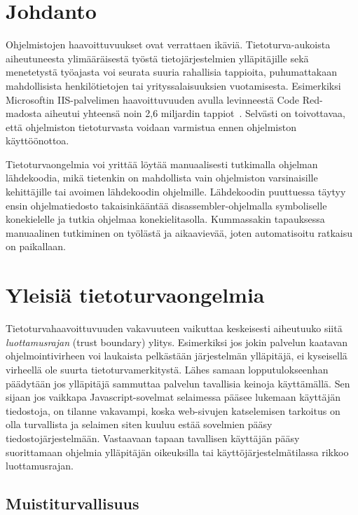 \section{Johdanto}

Ohjelmistojen haavoittuvuukset ovat verrattaen ikäviä.
Tietoturva-aukoista aiheutuneesta ylimääräisestä työstä tietojärjestelmien ylläpitäjille
sekä menetetystä työajasta voi seurata suuria rahallisia tappioita,
puhumattakaan mahdollisista henkilötietojen tai yrityssalaisuuksien vuotamisesta.
Esimerkiksi Microsoftin IIS-palvelimen haavoittuvuuden avulla levinneestä Code Red-madosta
aiheutui yhteensä noin 2,6 miljardin tappiot~\cite{CodeRed}.
Selvästi on toivottavaa, että ohjelmiston tietoturvasta voidaan varmistua ennen ohjelmiston käyttöönottoa.

Tietoturvaongelmia voi yrittää löytää manuaalisesti tutkimalla ohjelman lähdekoodia,
mikä tietenkin on mahdollista vain ohjelmiston varsinaisille kehittäjille
tai avoimen lähdekoodin ohjelmille.
Lähdekoodin puuttuessa täytyy ensin ohjelmatiedosto takaisinkääntää
disassembler-ohjelmalla symboliselle konekielelle
ja tutkia ohjelmaa konekielitasolla.
Kummassakin tapauksessa manuaalinen tutkiminen on työlästä ja aikaavievää, joten automatisoitu ratkaisu on paikallaan.

\section{Yleisiä tietoturvaongelmia}

Tietoturvahaavoittuvuuden vakavuuteen vaikuttaa keskeisesti aiheutuuko siitä \emph{luottamusrajan}
(trust boundary) ylitys.
Esimerkiksi jos jokin palvelun kaatavan ohjelmointivirheen voi laukaista pelkästään järjestelmän
ylläpitäjä, ei kyseisellä virheellä ole suurta tietoturvamerkitystä.
Lähes samaan lopputulokseenhan päädytään jos ylläpitäjä sammuttaa palvelun tavallisia keinoja käyttämällä.
Sen sijaan jos vaikkapa Javascript-sovelmat selaimessa pääsee lukemaan käyttäjän tiedostoja,
on tilanne vakavampi, koska web-sivujen katselemisen tarkoitus on olla turvallista ja selaimen siten
kuuluu estää sovelmien pääsy tiedostojärjestelmään.
Vastaavaan tapaan tavallisen käyttäjän pääsy suorittamaan ohjelmia ylläpitäjän oikeuksilla
tai käyttöjärjestelmätilassa rikkoo luottamusrajan.

\subsection{Muistiturvallisuus}

